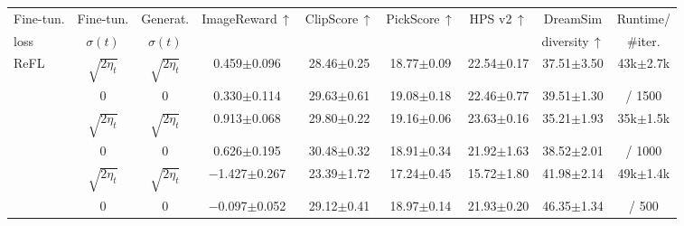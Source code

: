 \begin{table}[h!]
\centering
{\footnotesize
\begin{tabular}{lcccccccc}
    \toprule
    Fine-tun. & Fine-tun. & Generat. & \multirow{2}{*}{ImageReward$\, \uparrow$} & \multirow{2}{*}{ClipScore$\, \uparrow$} & \multirow{2}{*}{PickScore$\, \uparrow$} & \multirow{2}{*}{HPS v2$\, \uparrow$} & DreamSim & Runtime/ \\
    loss & $\sigma(t)$ & $\sigma(t)$ &  & &  &  & diversity$\, \uparrow$ & $\#$iter. \\
    \midrule %
    \multirow{2}{*}{ReFL}              & $\sqrt{2 \eta_t}$ & $\sqrt{2 \eta_t}$ & 0.459{\tiny$\pm$0.096} & 28.46{\tiny$\pm$0.25} & 18.77{\tiny$\pm$0.09} & 22.54{\tiny$\pm$0.17} & 37.51{\tiny$\pm$3.50} & 43k{\tiny$\pm$2.7k} \\
                                       & 0                 & 0                 & 0.330{\tiny$\pm$0.114} & 29.63{\tiny$\pm$0.61} & 19.08{\tiny$\pm$0.18} & 22.46{\tiny$\pm$0.77} & 39.51{\tiny$\pm$1.30} & / 1500 \\
    \addlinespace
    \multirow{2}{*}{DRaFT-1}           & $\sqrt{2 \eta_t}$ & $\sqrt{2 \eta_t}$ & 0.913{\tiny$\pm$0.068} & 29.80{\tiny$\pm$0.22} & 19.16{\tiny$\pm$0.06} & 23.63{\tiny$\pm$0.16} & 35.21{\tiny$\pm$1.93} & 35k{\tiny$\pm$1.5k} \\
                                       & 0                 & 0                 & 0.626{\tiny$\pm$0.195} & 30.48{\tiny$\pm$0.32} & 18.91{\tiny$\pm$0.34} & 21.92{\tiny$\pm$1.63} & 38.52{\tiny$\pm$2.01} & / 1000 \\
    \addlinespace
    \multirow{2}{*}{Draft-40}          & $\sqrt{2 \eta_t}$ & $\sqrt{2 \eta_t}$ & $-$1.427{\tiny$\pm$0.267} & 23.39{\tiny$\pm$1.72} & 17.24{\tiny$\pm$0.45} & 15.72{\tiny$\pm$1.80} & 41.98{\tiny$\pm$2.14} & 49k{\tiny$\pm$1.4k} \\
                                       & 0                 & 0                 & $-$0.097{\tiny$\pm$0.052} & 29.12{\tiny$\pm$0.41} & 18.97{\tiny$\pm$0.14} & 21.93{\tiny$\pm$0.20} & 46.35{\tiny$\pm$1.34} & / 500 \\
    \midrule %

\end{tabular}}
\end{table}
